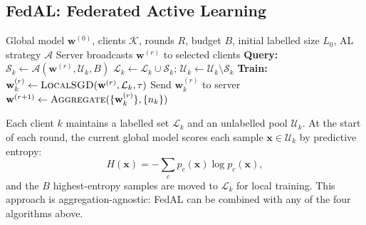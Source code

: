 \subsection{FedAL: Federated Active Learning}

\begin{algorithm}[t]
\caption{FedAL — Federated Active Learning}
\label{alg:fedal}
\begin{algorithmic}[1]
\Require Global model $\mathbf{w}^{(0)}$, clients $\mathcal{K}$, rounds $R$,
  budget $B$, initial labelled size $L_0$, AL strategy $\mathcal{A}$
  \State Server broadcasts $\mathbf{w}^{(r)}$ to selected clients
    \State \textbf{Query:} $\mathcal{S}_k \leftarrow
      \mathcal{A}(\mathbf{w}^{(r)}, \mathcal{U}_k, B)$
    \State $\mathcal{L}_k \leftarrow \mathcal{L}_k \cup \mathcal{S}_k$;
      $\mathcal{U}_k \leftarrow \mathcal{U}_k \setminus \mathcal{S}_k$
    \State \textbf{Train:} $\mathbf{w}_k^{(r)}
      \leftarrow \textsc{LocalSGD}(\mathbf{w}^{(r)}, \mathcal{L}_k, \tau)$
    \State Send $\mathbf{w}_k^{(r)}$ to server
  \EndFor
  \State $\mathbf{w}^{(r+1)} \leftarrow \textsc{Aggregate}(\{\mathbf{w}_k^{(r)}\},\{n_k\})$
\EndFor
\end{algorithmic}
\end{algorithm}

Each client $k$ maintains a labelled set $\mathcal{L}_k$ and an unlabelled
pool $\mathcal{U}_k$.
At the start of each round, the current global model scores each sample
$\mathbf{x} \in \mathcal{U}_k$ by predictive entropy:
\begin{equation}
  H(\mathbf{x}) = -\sum_c p_c(\mathbf{x})\log p_c(\mathbf{x}),
  \label{eq:entropy}
\end{equation}
and the $B$ highest-entropy samples are moved to $\mathcal{L}_k$ for local
training.
This approach is aggregation-agnostic: FedAL can be combined with any of
the four algorithms above.
